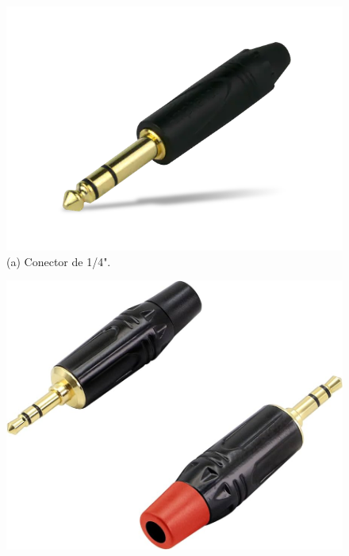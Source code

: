 \begin{figure}[htpb]
    \centering
    \begin{minipage}[t]{0.3\textwidth}
        \centering
        \includegraphics[width=\textwidth]{figuras/fig19.png}
        \vspace{0.3cm} %
        (a) Conector de 1/4".
    \end{minipage}
    \hfill
    \begin{minipage}[t]{0.3\textwidth}
        \centering
        \includegraphics[width=\textwidth]{figuras/fig20.png}
        \vspace{0.3cm} %

\end{minipage}
\end{figure}
